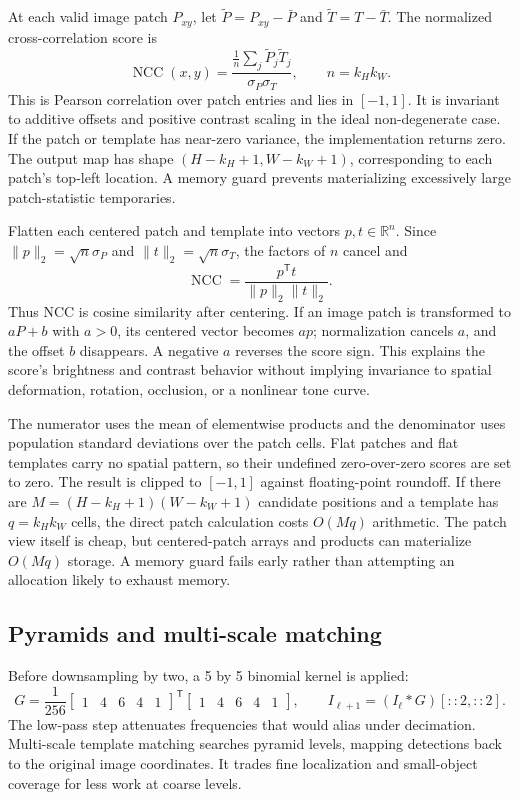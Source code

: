 \documentclass[11pt,a4paper]{article}
\newcommand{\R}{\mathbb{R}}
\newcommand{\1}{\mathbf{1}}
\begin{document}
At each valid image patch $P_{xy}$, let $\tilde P=P_{xy}-\bar P$ and
$\tilde T=T-\bar T$. The normalized cross-correlation score is
\[
 \operatorname{NCC}(x,y)=
 \frac{\frac{1}{n}\sum_j\tilde P_j\tilde T_j}
 {\sigma_P\sigma_T},\qquad n=k_Hk_W.
\]
This is Pearson correlation over patch entries and lies in $[-1,1]$. It is
invariant to additive offsets and positive contrast scaling in the ideal
non-degenerate case. If the patch or template has near-zero variance, the
implementation returns zero. The output map has shape
$(H-k_H+1,W-k_W+1)$, corresponding to each patch's top-left location. A memory
guard prevents materializing excessively large patch-statistic temporaries.

Flatten each centered patch and template into vectors $p,t\in\R^n$. Since
$\|p\|_2=\sqrt{n}\sigma_P$ and $\|t\|_2=\sqrt{n}\sigma_T$, the factors of
$n$ cancel and
\[
 \operatorname{NCC}=\frac{p^{\mathsf T}t}{\|p\|_2\|t\|_2}.
\]
Thus NCC is cosine similarity after centering. If an image patch is transformed
to $aP+b$ with $a>0$, its centered vector becomes $ap$; normalization cancels
$a$, and the offset $b$ disappears. A negative $a$ reverses the score sign.
This explains the score's brightness and contrast behavior without implying
invariance to spatial deformation, rotation, occlusion, or a nonlinear tone
curve.

The numerator uses the mean of elementwise products and the denominator uses
population standard deviations over the patch cells. Flat patches and flat
templates carry no spatial pattern, so their undefined zero-over-zero scores
are set to zero. The result is clipped to $[-1,1]$ against floating-point
roundoff. If there are $M=(H-k_H+1)(W-k_W+1)$ candidate positions and a template
has $q=k_Hk_W$ cells, the direct patch calculation costs $O(Mq)$ arithmetic.
The patch view itself is cheap, but centered-patch arrays and products can
materialize $O(Mq)$ storage. A memory guard fails early rather than attempting
an allocation likely to exhaust memory.

\subsection{Pyramids and multi-scale matching}

Before downsampling by two, a 5 by 5 binomial kernel is applied:
\[
 G=\frac{1}{256}\begin{bmatrix}1&4&6&4&1\end{bmatrix}^{\mathsf T}
 \begin{bmatrix}1&4&6&4&1\end{bmatrix},\qquad
 I_{\ell+1}=(I_\ell*G)[::2,::2].
\]
The low-pass step attenuates frequencies that would alias under decimation.
Multi-scale template matching searches pyramid levels, mapping detections back
to the original image coordinates. It trades fine localization and small-object
coverage for less work at coarse levels.
\end{document}
